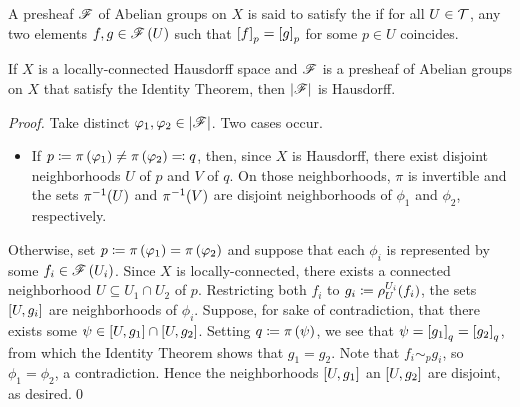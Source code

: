 \documentclass[../Moduli_Spaces_of_Riemann_Surfaces.tex]{subfiles}
\begin{document}
    \begin{definition}
        A presheaf $\mathscr{F}$ of Abelian groups on $X$ is said to satisfy the  if for all $U\in\mathcal{T}$, any two elements $f,g\in\mathscr{F}\left(U\right)$ such that $\left[f\right]_p=\left[g\right]_p$ for some $p\in U$ coincides.
    \end{definition}
    \begin{proposition}\label{2.2:prp:stalk_topology_Hausdorff}
        If $X$ is a locally-connected Hausdorff space and $\mathscr{F}$ is a presheaf of Abelian groups on $X$ that satisfy the Identity Theorem, then $\left|\mathscr{F}\right|$ is Hausdorff.
    \end{proposition}
    \begin{proof}
        Take distinct $\varphi_1,\varphi_2\in\left|\mathscr{F}\right|$. Two cases occur.
        \begin{itemize}
            \item If $p\coloneqq\pi\left(\varphi_1\right)\neq\pi\left(\varphi_2\right)\eqqcolon q$, then, since $X$ is Hausdorff, there exist disjoint neighborhoods $U$ of $p$ and $V$ of $q$. On those neighborhoods, $\pi$ is invertible and the sets $\pi^{-1}\!\left(U\right)$ and $\pi^{-1}\!\left(V\right)$ are disjoint neighborhoods of $\phi_1$ and $\phi_2$, respectively.
        \end{itemize}
        Otherwise, set $p\coloneqq\pi\left(\varphi_1\right)=\pi\left(\varphi_2\right)$ and suppose that each $\phi_i$ is represented by some $f_i\in\mathscr{F}\left(U_i\right)$. Since $X$ is locally-connected, there exists a connected neighborhood $U\subseteq U_1\cap U_2$ of $p$. Restricting both $f_i$ to $g_i\coloneqq\rho^{U_i}_U\!\left(f_i\right)$, the sets $\left[U,g_i\right]$ are neighborhoods of $\phi_i$. Suppose, for sake of contradiction, that there exists some $\psi\in\left[U,g_1\right]\cap\left[U,g_2\right]$. Setting $q\coloneqq\pi\left(\psi\right)$, we see that $\psi=\left[g_1\right]_q=\left[g_2\right]_q$, from which the Identity Theorem shows that $g_1=g_2$. Note that $f_i\sim_pg_i$, so $\phi_1=\phi_2$, a contradiction. Hence the neighborhoods $\left[U,g_1\right]$ an $\left[U,g_2\right]$ are disjoint, as desired.\qed
    \end{proof}
\end{document}
